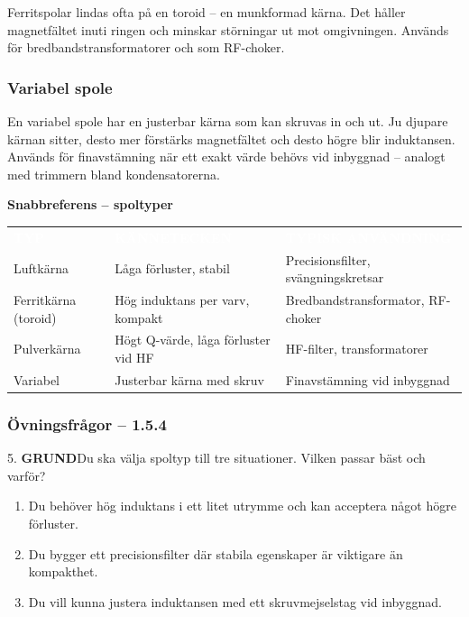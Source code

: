 \documentclass[a4paper,11pt,twoside]{book}
\newcommand{\tblhdr}[1]{\cellcolor{greydark}\textcolor{white}{\headingfont\bfseries\footnotesize\MakeUppercase{#1}}}
\newcommand{\qgrund}{\colorbox{greenpale}{\textcolor{greendark}{\headingfont\bfseries\tiny GRUND}}}
\begin{document}
Ferritspolar lindas ofta på en toroid -- en munkformad 
kärna. Det håller magnetfältet inuti ringen och minskar 
störningar ut mot omgivningen. Används för 
bredbandstransformatorer och som RF-choker.

\subsubsection*{Variabel spole}

En variabel spole har en justerbar kärna som kan 
skruvas in och ut. Ju djupare kärnan sitter, desto 
mer förstärks magnetfältet och desto högre blir 
induktansen. Används för finavstämning när ett exakt 
värde behövs vid inbyggnad -- analogt med trimmern 
bland kondensatorerna.

\medskip
\noindent\textbf{Snabbreferens -- spoltyper}

\begin{center}
\begin{tabular}{L{2.8cm}L{4cm}L{3.5cm}}
\tblhdr{Typ} & \tblhdr{Kännetecken} & \tblhdr{Typisk användning} \\
Luftkärna & Låga förluster, stabil & Precisionsfilter, svängningskretsar \\
Ferritkärna (toroid) & Hög induktans per varv, kompakt & Bredbandstransformator, RF-choker \\
Pulverkärna & Högt Q-värde, låga förluster vid HF & HF-filter, transformatorer \\
Variabel & Justerbar kärna med skruv & Finavstämning vid inbyggnad \\
\end{tabular}
\end{center}

\subsubsection*{Övningsfrågor -- 1.5.4}

\begin{qblock}{5.}
\qgrund\quad Du ska välja spoltyp till tre situationer. 
Vilken passar bäst och varför?
\begin{enumerate}[label=\alph*)]
  \item Du behöver hög induktans i ett litet utrymme 
        och kan acceptera något högre förluster.
  \item Du bygger ett precisionsfilter där stabila 
        egenskaper är viktigare än kompakthet.
  \item Du vill kunna justera induktansen med ett 
        skruvmejselstag vid inbyggnad.
\end{enumerate}
\end{qblock}
\end{document}
